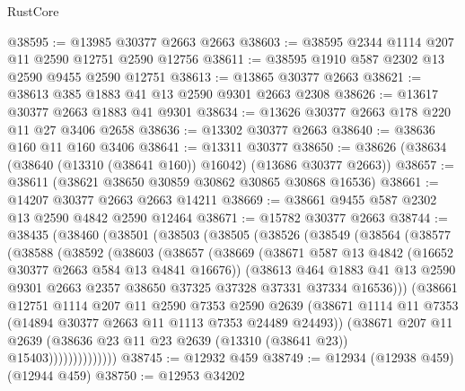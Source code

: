 \begin{lexlean}{RustCore}
\begin{coremodule}
@38595 := @13985 @30377 @2663 @2663
@38603 := @38595 @2344 @1114 @207 @11 @2590 @12751 @2590 @12756
@38611 := @38595 @1910 @587 @2302 @13 @2590 @9455 @2590 @12751
@38613 := @13865 @30377 @2663
@38621 := @38613 @385 @1883 @41 @13 @2590 @9301 @2663 @2308
@38626 := @13617 @30377 @2663 @1883 @41 @9301
@38634 := @13626 @30377 @2663 @178 @220 @11 @27 @3406 @2658
@38636 := @13302 @30377 @2663
@38640 := @38636 @160 @11 @160 @3406
@38641 := @13311 @30377
@38650 := @38626 (@38634 (@38640 (@13310 (@38641 @160)) @16042) (@13686 @30377 @2663))
@38657 := @38611 (@38621 @38650 @30859 @30862 @30865 @30868 @16536)
@38661 := @14207 @30377 @2663 @2663 @14211
@38669 := @38661 @9455 @587 @2302 @13 @2590 @4842 @2590 @12464
@38671 := @15782 @30377 @2663
@38744 := @38435
    (@38460
      (@38501
        (@38503
          (@38505
            (@38526
              (@38549
                (@38564
                  (@38577
                    (@38588
                      (@38592
                        (@38603
                          (@38657
                            (@38669
                              (@38671 @587 @13 @4842 (@16652 @30377 @2663 @584 @13 @4841 @16676))
                              (@38613
                                @464
                                @1883
                                @41
                                @13
                                @2590
                                @9301
                                @2663
                                @2357
                                @38650
                                @37325
                                @37328
                                @37331
                                @37334
                                @16536)))
                          (@38661
                            @12751
                            @1114
                            @207
                            @11
                            @2590
                            @7353
                            @2590
                            @2639
                            (@38671
                              @1114
                              @11
                              @7353
                              (@14894 @30377 @2663 @11 @1113 @7353 @24489 @24493))
                            (@38671
                              @207
                              @11
                              @2639
                              (@38636 @23 @11 @23 @2639 (@13310 (@38641 @23)) @15403))))))))))))))
@38745 := @12932 @459
@38749 := @12934 (@12938 @459) (@12944 @459)
@38750 := @12953 @34202

\end{coremodule}
\end{lexlean}
